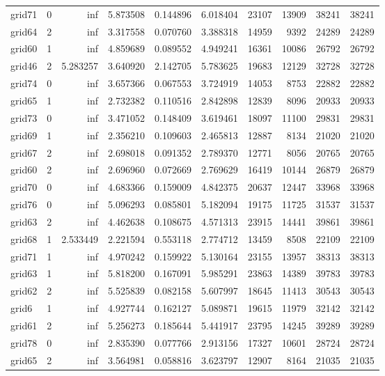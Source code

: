 \begin{longtable}{|l|r|r|r|r|r|r|r|r|r|}
grid71 & 0 & inf & 5.873508 & 0.144896 & 6.018404 & 23107 & 13909 & 38241 & 38241 \\
grid64 & 2 & inf & 3.317558 & 0.070760 & 3.388318 & 14959 & 9392 & 24289 & 24289 \\
grid60 & 1 & inf & 4.859689 & 0.089552 & 4.949241 & 16361 & 10086 & 26792 & 26792 \\
grid46 & 2 & 5.283257 & 3.640920 & 2.142705 & 5.783625 & 19683 & 12129 & 32728 & 32728 \\
grid74 & 0 & inf & 3.657366 & 0.067553 & 3.724919 & 14053 & 8753 & 22882 & 22882 \\
grid65 & 1 & inf & 2.732382 & 0.110516 & 2.842898 & 12839 & 8096 & 20933 & 20933 \\
grid73 & 0 & inf & 3.471052 & 0.148409 & 3.619461 & 18097 & 11100 & 29831 & 29831 \\
grid69 & 1 & inf & 2.356210 & 0.109603 & 2.465813 & 12887 & 8134 & 21020 & 21020 \\
grid67 & 2 & inf & 2.698018 & 0.091352 & 2.789370 & 12771 & 8056 & 20765 & 20765 \\
grid60 & 2 & inf & 2.696960 & 0.072669 & 2.769629 & 16419 & 10144 & 26879 & 26879 \\
grid70 & 0 & inf & 4.683366 & 0.159009 & 4.842375 & 20637 & 12447 & 33968 & 33968 \\
grid76 & 0 & inf & 5.096293 & 0.085801 & 5.182094 & 19175 & 11725 & 31537 & 31537 \\
grid63 & 2 & inf & 4.462638 & 0.108675 & 4.571313 & 23915 & 14441 & 39861 & 39861 \\
grid68 & 1 & 2.533449 & 2.221594 & 0.553118 & 2.774712 & 13459 & 8508 & 22109 & 22109 \\
grid71 & 1 & inf & 4.970242 & 0.159922 & 5.130164 & 23155 & 13957 & 38313 & 38313 \\
grid63 & 1 & inf & 5.818200 & 0.167091 & 5.985291 & 23863 & 14389 & 39783 & 39783 \\
grid62 & 2 & inf & 5.525839 & 0.082158 & 5.607997 & 18645 & 11413 & 30543 & 30543 \\
grid6 & 1 & inf & 4.927744 & 0.162127 & 5.089871 & 19615 & 11979 & 32142 & 32142 \\
grid61 & 2 & inf & 5.256273 & 0.185644 & 5.441917 & 23795 & 14245 & 39289 & 39289 \\
grid78 & 0 & inf & 2.835390 & 0.077766 & 2.913156 & 17327 & 10601 & 28724 & 28724 \\
grid65 & 2 & inf & 3.564981 & 0.058816 & 3.623797 & 12907 & 8164 & 21035 & 21035 \\

\end{longtable}
